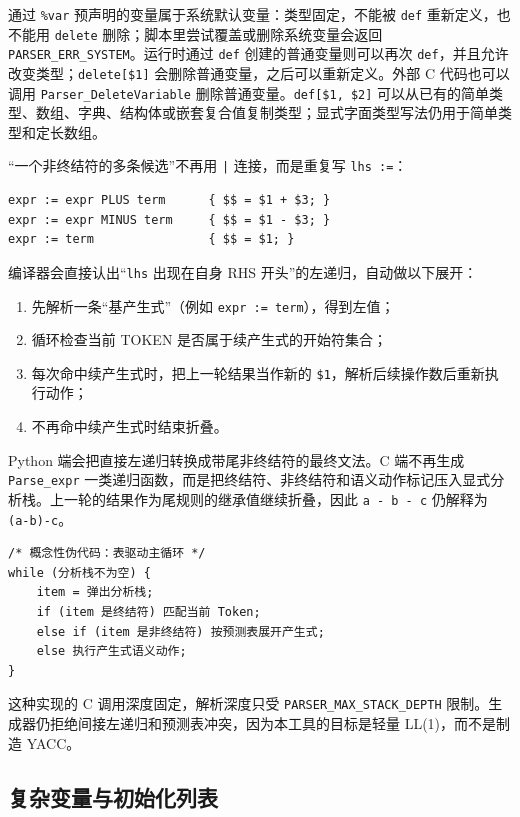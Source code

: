 通过 \texttt{\%var} 预声明的变量属于系统默认变量：类型固定，不能被 \texttt{def} 重新定义，也不能用 \texttt{delete} 删除；脚本里尝试覆盖或删除系统变量会返回 \texttt{PARSER\_ERR\_SYSTEM}。运行时通过 \texttt{def} 创建的普通变量则可以再次 \texttt{def}，并且允许改变类型；\texttt{delete[\$1]} 会删除普通变量，之后可以重新定义。外部 C 代码也可以调用 \texttt{Parser\_DeleteVariable} 删除普通变量。\texttt{def[\$1, \$2]} 可以从已有的简单类型、数组、字典、结构体或嵌套复合值复制类型；显式字面类型写法仍用于简单类型和定长数组。

“一个非终结符的多条候选”不再用 \texttt{|} 连接，而是重复写 \texttt{lhs :=}：

\begin{lstlisting}
expr := expr PLUS term      { $$ = $1 + $3; }
expr := expr MINUS term     { $$ = $1 - $3; }
expr := term                { $$ = $1; }
\end{lstlisting}

编译器会直接认出“\texttt{lhs} 出现在自身 RHS 开头”的左递归，自动做以下展开：

\begin{enumerate}
\item 先解析一条“基产生式”（例如 \texttt{expr := term}），得到左值；
\item 循环检查当前 TOKEN 是否属于续产生式的开始符集合；
\item 每次命中续产生式时，把上一轮结果当作新的 \texttt{\$1}，解析后续操作数后重新执行动作；
\item 不再命中续产生式时结束折叠。
\end{enumerate}

Python 端会把直接左递归转换成带尾非终结符的最终文法。C 端不再生成 \texttt{Parse\_expr} 一类递归函数，而是把终结符、非终结符和语义动作标记压入显式分析栈。上一轮的结果作为尾规则的继承值继续折叠，因此 \texttt{a - b - c} 仍解释为 \texttt{(a-b)-c}。

\begin{lstlisting}[style=c]
/* 概念性伪代码：表驱动主循环 */
while (分析栈不为空) {
    item = 弹出分析栈;
    if (item 是终结符) 匹配当前 Token;
    else if (item 是非终结符) 按预测表展开产生式;
    else 执行产生式语义动作;
}
\end{lstlisting}

这种实现的 C 调用深度固定，解析深度只受 \texttt{PARSER\_MAX\_STACK\_DEPTH} 限制。生成器仍拒绝间接左递归和预测表冲突，因为本工具的目标是轻量 LL(1)，而不是制造 YACC。

\subsection{复杂变量与初始化列表}

